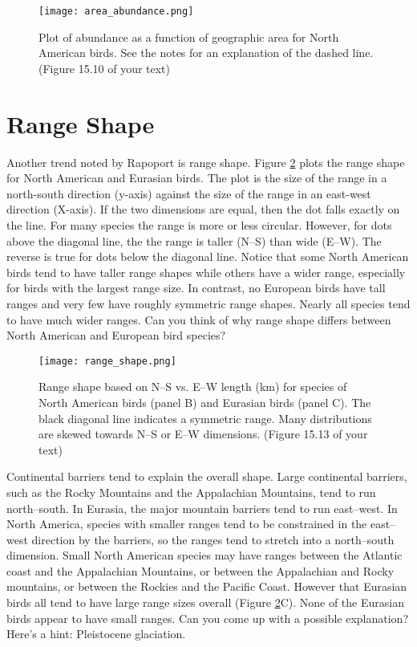 \documentclass[12pt, oneside]{article}   	%
\begin{document}
\begin{figure}[!ht]
	\centering
		\texttt{[image: area\_abundance.png]}  
		\caption{Plot of abundance as a function of geographic area for North American birds.  See the notes for an explanation of the dashed line. (Figure 15.10 of your text) \label{area and abundance}}
\end{figure}

\section{Range Shape}

Another trend noted by Rapoport is range shape.  Figure \ref{range shape} plots the range shape for North American and Eurasian birds.  The plot is the size of the range in a north-south direction (y-axis) against the size of the range in an east-west direction (X-axis). If the two dimensions are equal, then the dot falls exactly on the line.  For many species the range is more or less circular.  However, for dots above the diagonal line, the the range is taller (N--S) than wide (E--W).  The reverse is true for dots below the diagonal line.  Notice that some North American birds tend to have taller range shapes while others have a wider range, especially for birds with the largest range size.  In contrast, no European birds have tall ranges and very few have roughly symmetric range shapes. Nearly all species tend to have much wider ranges.  Can you think of why range shape differs between North American and European bird species?

\begin{figure}[!ht]
	\centering
		\texttt{[image: range\_shape.png]}  
		\caption{Range shape based on N--S vs. E--W length (km) for species of North American birds (panel B) and Eurasian birds (panel C). The black diagonal line indicates a symmetric range. Many distributions are skewed towards N--S or E--W dimensions. (Figure 15.13 of your text) \label{range shape}}
\end{figure}

Continental barriers tend to explain the overall shape.  Large continental barriers, such as the Rocky Mountains and the Appalachian Mountains, tend to run north--south.  In Eurasia, the major mountain barriers tend to run east--west. In North America, species with smaller ranges tend to be constrained in the east--west direction by the barriers, so the ranges tend to stretch into a north--south dimension.  Small North American species may have ranges between the Atlantic coast and the Appalachian Mountains, or between the Appalachian and Rocky mountains, or between the Rockies and the Pacific Coast.  However that Eurasian birds all tend to have large range sizes overall (Figure \ref{range shape}C).  None of the Eurasian birds appear to have small ranges. Can you come up with a possible explanation?  Here's a hint: Pleistocene glaciation.
\end{document}
